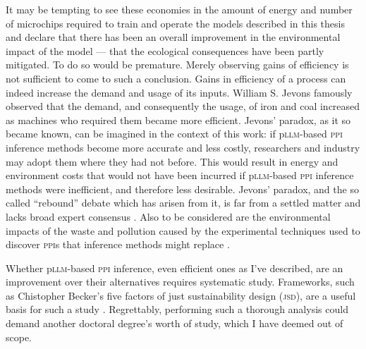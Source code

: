 It may be tempting to see these economies in the amount of energy and number of microchips required to train and operate the models described in this thesis and declare that there has been an overall improvement in the environmental impact of the model --- that the ecological consequences have been partly mitigated. To do so would be premature. Merely observing gains of efficiency is not sufficient to come to such a conclusion. Gains in efficiency of a process can indeed increase the demand and usage of its inputs. William S. Jevons famously observed that the demand, and consequently the usage, of iron and coal increased as machines who required them became more efficient. Jevons' paradox, as it so became known, can be imagined in the context of this work: if p\textsc{llm}-based \textsc{ppi} inference methods become more accurate and less costly, researchers and industry may adopt them where they had not before. This would result in energy and environment costs that would not have been incurred if p\textsc{llm}-based \textsc{ppi} inference methods were inefficient, and therefore less desirable. Jevons' paradox, and the so called ``rebound'' debate which has arisen from it, is far from a settled matter and lacks broad expert consensus \cite{alcott_jevons_2005}. Also to be considered are the environmental impacts of the waste and pollution caused by the experimental techniques used to discover \textsc{ppi}s that inference methods might replace \cite{endris_medical_2022, alves_case_2021, thakur_approaching_2024, tan_plastic_2022}.

Whether p\textsc{llm}-based \textsc{ppi} inference, even efficient ones as I've described, are an improvement over their alternatives requires systematic study. Frameworks, such as Chistopher Becker's five factors of just sustainability design (\textsc{jsd}), are a useful basis for such a study \cite{becker_what_2023}. Regrettably, performing such a thorough analysis could demand another doctoral degree's worth of study, which I have deemed out of scope.